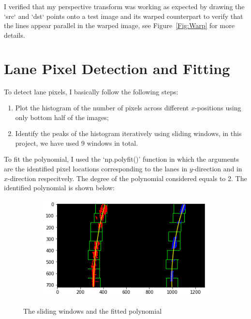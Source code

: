 \documentclass[draftcls,onecolumn,12pt]{IEEEtran}
\theoremstyle{plain}
\theoremstyle{plain}
\begin{document}
I verified that my perspective transform was working as expected by drawing the `src` and `dst` points onto a test image and its warped counterpart to verify that the lines appear parallel in the warped image, see Figure~\ref{Fig:Warp} for more details.

\section{Lane Pixel Detection and Fitting}
To detect lane pixels, I basically follow the following steps:
\begin{enumerate}
\item Plot the histogram of the number of pixels across different $x$-positions using only bottom half of the images;
\item Identify the peaks of the histogram iteratively using sliding windows, in this project, we have used 9 windows in total.
\end{enumerate}

To fit the polynomial, I used the `np.polyfit()' function in which the arguments are the identified pixel locations corresponding to the lanes in $y$-direction and in $x$-direction respecitvely. The degree of the polynomial considered equals to 2. The identified polynomial is shown below:

\begin{figure}[htb!!]
    \centering
   \begin{subfigure}[t]{0.5\textwidth}
        \includegraphics[width=\textwidth]{./figures/Polyfit.png}\\
    \end{subfigure}
    \caption{The sliding windows and the fitted polynomial}\label{Fig:PolyFit}
\end{figure}
\end{document}
